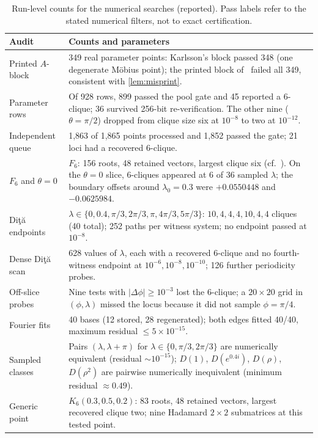 \documentclass[11pt]{article}
\numberwithin{equation}{section}
\theoremstyle{plain}
\theoremstyle{definition}
\theoremstyle{remark}
\newcommand{\Dita}{\texorpdfstring{Di\c{t}\u{a}}{Dita}}
\begin{document}
\begin{table}[ht]
\centering\small
\caption{Run-level counts for the numerical searches (reported). Pass labels refer to the stated numerical filters, not to exact certification.}
\label{tab:audit}
\begin{tabular}{@{}p{3.2cm}p{11.6cm}@{}}
\toprule
Audit & Counts and parameters\\
\midrule
Printed $A$-block & 349 real parameter points: Karlsson's block passed 348 (one degenerate M\"obius point); the printed block of~\cite{McNultyWeigert2026} failed all 349, consistent with \cref{lem:misprint}.\\
Parameter rows & Of 928 rows, 899 passed the pool gate and 45 reported a $6$-clique; 36 survived 256-bit re-verification. The other nine ($\theta=\pi/2$) dropped from clique size six at $10^{-8}$ to two at $10^{-12}$.\\
Independent queue & 1{,}863 of 1{,}865 points processed and 1{,}852 passed the gate; 21 loci had a recovered $6$-clique.\\
$F_6$ and $\theta=0$ & $F_6$: 156 roots, 48 retained vectors, largest clique six (cf.~\cite{Grassl2004}). On the $\theta=0$ slice, $6$-cliques appeared at 6 of 36 sampled $\lambda$; the boundary offsets around $\lambda_0=0.3$ were $+0.0550448$ and $-0.0625984$.\\
\Dita{} endpoints & $\lambda\in\{0,0.4,\pi/3,2\pi/3,\pi,4\pi/3,5\pi/3\}$: $10,4,4,4,10,4,4$ cliques (40 total); 252 paths per witness system; no endpoint passed at $10^{-8}$.\\
Dense \Dita{} scan & 628 values of $\lambda$, each with a recovered $6$-clique and no fourth-witness endpoint at $10^{-6},10^{-8},10^{-10}$; 126 further periodicity probes.\\
Off-slice probes & Nine tests with $|\Delta\phi|\ge10^{-3}$ lost the $6$-clique; a $20\times20$ grid in $(\phi,\lambda)$ missed the locus because it did not sample $\phi=\pi/4$.\\
Fourier fits & 40 bases (12 stored, 28 regenerated); both edges fitted 40/40, maximum residual $\le5\times10^{-15}$.\\
Sampled classes & Pairs $(\lambda,\lambda+\pi)$ for $\lambda\in\{0,\pi/3,2\pi/3\}$ are numerically equivalent (residual $\sim10^{-15}$); $D(1)$, $D(e^{0.4i})$, $D(\rho)$, $D(\rho^2)$ are pairwise numerically inequivalent (minimum residual $\approx0.49$).\\
Generic point & $K_6(0.3,0.5,0.2)$: 83 roots, 48 retained vectors, largest recovered clique two; nine Hadamard $2\times2$ submatrices at this tested point.\\
\bottomrule
\end{tabular}
\end{table}
\end{document}
